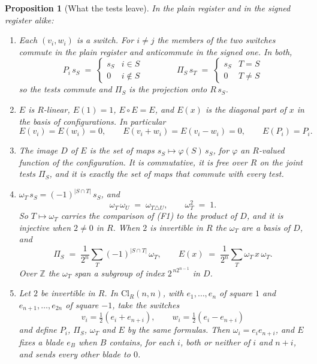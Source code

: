 \documentclass[11pt]{article}
\theoremstyle{plain}
\theoremstyle{definition}
\theoremstyle{plain}
\newtheorem{proposition}[theorem]{Proposition}
\theoremstyle{definition}
\newcommand{\Cl}{\mathrm{Cl}}
\newcommand{\Z}{\mathbb{Z}}
\begin{document}
\begin{proposition}[What the tests leave]\label{prop:pinching}
In the plain register and in the signed register alike:
\begin{enumerate}
\item[(i)] Each $(v_{i}, w_{i})$ is a switch. For $i \neq j$ the members of the two switches commute in the plain register and anticommute in the signed one. In both,
\[
P_{i}\,s_{S} \;=\; \begin{cases} s_{S} & i \in S \\ 0 & i \notin S \end{cases}
\qquad\qquad
\Pi_{S}\,s_{T} \;=\; \begin{cases} s_{S} & T = S \\ 0 & T \neq S \end{cases}
\]
so the tests commute and $\Pi_{S}$ is the projection onto $R\,s_{S}$.
\item[(ii)] $E$ is $R$-linear, $E(1) = 1$, $E \circ E = E$, and $E(x)$ is the diagonal part of $x$ in the basis of configurations. In particular
\[
E(v_{i}) = E(w_{i}) = 0, \qquad E(v_{i} + w_{i}) = E(v_{i} - w_{i}) = 0, \qquad E(P_{i}) = P_{i} .
\]
\item[(iii)] The image $D$ of $E$ is the set of maps $s_{S} \mapsto \varphi(S)\,s_{S}$, for $\varphi$ an $R$-valued function of the configuration. It is commutative, it is free over $R$ on the joint tests $\Pi_{S}$, and it is exactly the set of maps that commute with every test.
\item[(iv)] $\omega_{T}\,s_{S} = (-1)^{|S \cap T|}\,s_{S}$, and
\[
\omega_{T}\,\omega_{U} \;=\; \omega_{T \triangle U}, \qquad \omega_{T}^{2} \;=\; 1 .
\]
So $T \mapsto \omega_{T}$ carries the comparison of (F1) to the product of $D$, and it is injective when $2 \neq 0$ in $R$. When $2$ is invertible in $R$ the $\omega_{T}$ are a basis of $D$, and
\[
\Pi_{S} \;=\; \frac{1}{2^{n}} \sum_{T} (-1)^{|S \cap T|}\,\omega_{T},
\qquad
E(x) \;=\; \frac{1}{2^{n}} \sum_{T} \omega_{T}\,x\,\omega_{T} .
\]
Over $\Z$ the $\omega_{T}$ span a subgroup of index $2^{\,n2^{n-1}}$ in $D$.
\item[(v)] Let $2$ be invertible in $R$. In $\Cl_{R}(n,n)$, with $e_{1}, \dots, e_{n}$ of square $1$ and $e_{n+1}, \dots, e_{2n}$ of square $-1$, take the switches
\[
v_{i} = \tfrac12(e_{i} + e_{n+i}), \qquad w_{i} = \tfrac12(e_{i} - e_{n+i})
\]
and define $P_{i}$, $\Pi_{S}$, $\omega_{T}$ and $E$ by the same formulas. Then $\omega_{i} = e_{i}e_{n+i}$, and $E$ fixes a blade $e_{B}$ when $B$ contains, for each $i$, both or neither of $i$ and $n+i$, and sends every other blade to $0$.

\end{enumerate}
\end{proposition}
\end{document}
